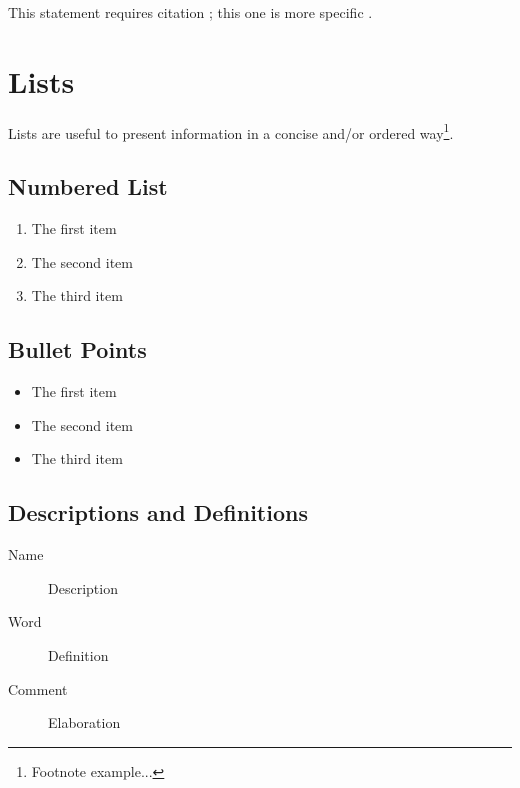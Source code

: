 \documentclass[11pt,fleqn]{book} %
\begin{document}
This statement requires citation \cite{book_key}; this one is more specific \cite[122]{article_key}.


\section{Lists}

Lists are useful to present information in a concise and/or ordered way\footnote{Footnote example...}.

\subsection{Numbered List}

\begin{enumerate}
\item The first item
\item The second item
\item The third item
\end{enumerate}

\subsection{Bullet Points}

\begin{itemize}
\item The first item
\item The second item
\item The third item
\end{itemize}

\subsection{Descriptions and Definitions}

\begin{description}
\item[Name] Description
\item[Word] Definition
\item[Comment] Elaboration
\end{description}

\end{document}
